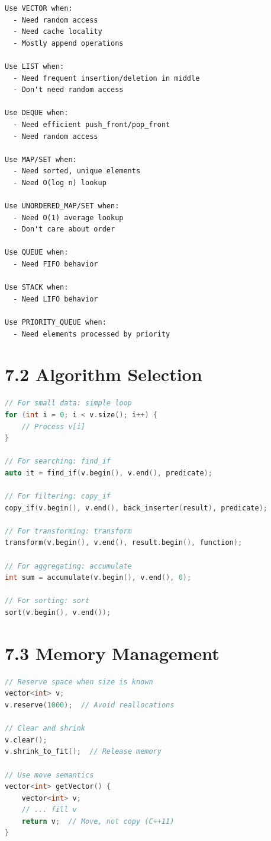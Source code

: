 \begin{lstlisting}
Use VECTOR when:
  - Need random access
  - Need cache locality
  - Mostly append operations

Use LIST when:
  - Need frequent insertion/deletion in middle
  - Don't need random access

Use DEQUE when:
  - Need efficient push_front/pop_front
  - Need random access

Use MAP/SET when:
  - Need sorted, unique elements
  - Need O(log n) lookup

Use UNORDERED_MAP/SET when:
  - Need O(1) average lookup
  - Don't care about order

Use QUEUE when:
  - Need FIFO behavior

Use STACK when:
  - Need LIFO behavior

Use PRIORITY_QUEUE when:
  - Need elements processed by priority
\end{lstlisting}

\hypertarget{algorithm-selection}{%
\section{7.2 Algorithm Selection}\label{algorithm-selection}}

\begin{lstlisting}[language={C++}]
// For small data: simple loop
for (int i = 0; i < v.size(); i++) {
    // Process v[i]
}

// For searching: find_if
auto it = find_if(v.begin(), v.end(), predicate);

// For filtering: copy_if
copy_if(v.begin(), v.end(), back_inserter(result), predicate);

// For transforming: transform
transform(v.begin(), v.end(), result.begin(), function);

// For aggregating: accumulate
int sum = accumulate(v.begin(), v.end(), 0);

// For sorting: sort
sort(v.begin(), v.end());
\end{lstlisting}

\hypertarget{memory-management}{%
\section{7.3 Memory Management}\label{memory-management}}

\begin{lstlisting}[language={C++}]
// Reserve space when size is known
vector<int> v;
v.reserve(1000);  // Avoid reallocations

// Clear and shrink
v.clear();
v.shrink_to_fit();  // Release memory

// Use move semantics
vector<int> getVector() {
    vector<int> v;
    // ... fill v
    return v;  // Move, not copy (C++11)
}
\end{lstlisting}

